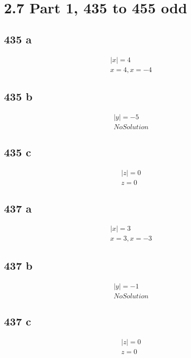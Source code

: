 \documentclass{article}
\begin{document}
    \section*{2.7 Part 1, 435 to 455 odd}
    \subsection*{435 a}
    \begin{align*}
        &|x| = 4 \\
        &\boxed{x = 4, x = -4}
    \end{align*}

    \subsection*{435 b}
    \begin{align*}
        &|y| = -5 \\
        &\boxed{No Solution}
    \end{align*}

    \subsection*{435 c}
    \begin{align*}
        &|z| = 0 \\
        &\boxed{z = 0}
    \end{align*}

    \subsection*{437 a}
    \begin{align*}
        &|x| = 3 \\
        &\boxed{x = 3,x = -3}
    \end{align*}

    \subsection*{437 b}
    \begin{align*}
        &|y| = -1 \\
        &\boxed{No Solution}
    \end{align*}

    \subsection*{437 c}
    \begin{align*}
        &|z| = 0 \\
        &\boxed{z = 0}
    \end{align*}
\end{document}
